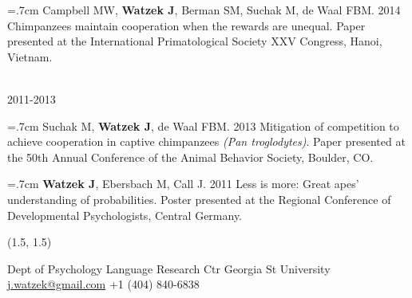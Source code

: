 \documentclass[]{friggeri-cv}
\begin{document}
\hangindent=.7cm Campbell MW, \textbf{Watzek J}, Berman SM, Suchak M, de Waal FBM. 2014 Chimpanzees maintain cooperation when the rewards are unequal. Paper presented at the International Primatological Society XXV Congress, Hanoi, Vietnam.


{\large{} ~\\[-.15cm] 2011-2013}

\hangindent=.7cm Suchak M, \textbf{Watzek J}, de Waal FBM. 2013 Mitigation of competition to achieve cooperation in captive chimpanzees \emph{(Pan troglodytes)}. Paper presented at the 50th Annual Conference of the Animal Behavior Society, Boulder, CO.

\hangindent=.7cm \textbf{Watzek J}, Ebersbach M, Call J. 2011 Less is more: Great apes' understanding of probabilities. Poster presented at the Regional Conference of Developmental Psychologists, Central Germany.\\[-.1cm]


\renewenvironment{aside}{%
  \let\oldsection\section
  \renewcommand{\section}[1]{
    \par\vspace{\baselineskip}{\Large\headingfont\color{headercolor} ##1}
  }
  \begin{textblock}{3.6}(1.5, 1.5)
  \begin{flushright}
  \obeycr
}{%
  \restorecr
  \end{flushright}
  \end{textblock}
  \let\section\oldsection
}


\begin{aside}
  \section{{\normalfont julia}watzek}
    Dept of Psychology
    Language Research Ctr
    Georgia St University
    ~
    \href{mailto:j.watzek@gmail.com}{j.watzek@gmail.com}
    +1 (404) 840-6838
\end{aside}
\end{document}
